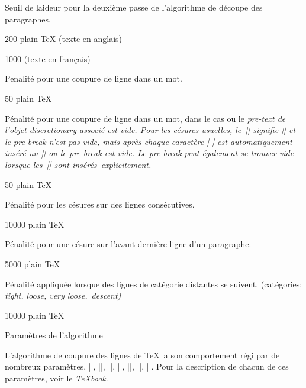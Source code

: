 \item\tolerance
Seuil de laideur pour la deuxième passe de l'algorithme de découpe
des paragraphes.

\beginvalues
\item{200} plain TeX (texte en anglais)
\item{1000}  (texte en français)
\endvalues

\item\hyphenpenalty
Penalité pour une coupure de ligne dans un mot.

\beginvalues
\item{50} plain TeX
\endvalues

\item\exhyphenpenalty
Pénalité pour une coupure de ligne dans un mot, dans le cas ou le
\em{pre-text} de l'objet discretionary associé est vide. Pour les
césures usuelles, le~|\-| signifie |\discretionary{-}{}{}| et le
\em{pre-break} n'est pas vide, mais après chaque caractère |-| est
automatiquement inséré un |\discretionary{}{}{}| ou le \em{pre-break}
est vide. Le \em{pre-break} peut également se trouver vide lorsque
les~|\discretionary| sont insérés~explicitement.

\beginvalues
\item{50} plain \TeX
\endvalues

\item\doublehyphendemerits
Pénalité pour les césures sur des lignes consécutives.

\beginvalues
\item{10000} plain \TeX
\endvalues

\item\finalhyphendemerits
Pénalité pour une césure sur l'avant-dernière ligne d'un
paragraphe.

\beginvalues
\item{5000} plain \TeX
\endvalues

\item\adjdemerits
Pénalité appliquée lorsque des lignes de catégorie distantes se
suivent. (catégories: \em{tight}, \em{loose}, \em{very loose},~\em{descent}\/)

\beginvalues
\item{10000} plain \TeX
\endvalues

\endcslist


\formalpar Paramètres de l'algorithme

L'algorithme de coupure des lignes de \TeX\ a son comportement régi
par de nombreux paramètres, |\pretolerance|, |\tolerance|,
|\hyphenpenalty|, |\exyphenpenalty|, |\doublehyphendemerits|,
|\finalhyphendemerits|, |\adjdemerits|. Pour la description de chacun
de ces paramètres, voir le {\sl\TeX book}.

